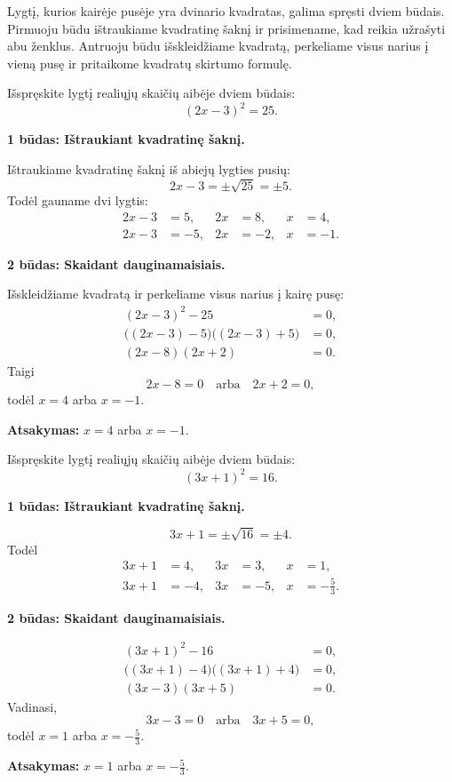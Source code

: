 \documentclass[11pt,a4paper]{scrartcl}
\begin{document}
Lygtį, kurios kairėje pusėje yra dvinario kvadratas, galima spręsti dviem būdais. Pirmuoju būdu ištraukiame kvadratinę šaknį ir prisimename, kad reikia užrašyti abu ženklus. Antruoju būdu išskleidžiame kvadratą, perkeliame visus narius į vieną pusę ir pritaikome kvadratų skirtumo formulę.

\begin{example}
Išspręskite lygtį realiųjų skaičių aibėje dviem būdais:
\[ (2x-3)^2=25. \]
\end{example}
\begin{solution}
\textbf{1 būdas: Ištraukiant kvadratinę šaknį.}

Ištraukiame kvadratinę šaknį iš abiejų lygties pusių:
\[
2x-3=\pm\sqrt{25}=\pm5.
\]
Todėl gauname dvi lygtis:
\[
\begin{aligned}
2x-3&=5, & 2x&=8, & x&=4,\\
2x-3&=-5, & 2x&=-2, & x&=-1.
\end{aligned}
\]

\textbf{2 būdas: Skaidant dauginamaisiais.}

Išskleidžiame kvadratą ir perkeliame visus narius į kairę pusę:
\[
\begin{aligned}
(2x-3)^2-25&=0,\\
\bigl((2x-3)-5\bigr)\bigl((2x-3)+5\bigr)&=0,\\
(2x-8)(2x+2)&=0.
\end{aligned}
\]
Taigi
\[
2x-8=0 \quad \text{arba} \quad 2x+2=0,
\]
todėl $x=4$ arba $x=-1$.

\textbf{Atsakymas:} $x=4$ arba $x=-1$.
\end{solution}

\begin{example}
Išspręskite lygtį realiųjų skaičių aibėje dviem būdais:
\[ (3x+1)^2=16. \]
\end{example}
\begin{solution}
\textbf{1 būdas: Ištraukiant kvadratinę šaknį.}

\[
3x+1=\pm\sqrt{16}=\pm4.
\]
Todėl
\[
\begin{aligned}
3x+1&=4, & 3x&=3, & x&=1,\\
3x+1&=-4, & 3x&=-5, & x&=-\frac{5}{3}.
\end{aligned}
\]

\textbf{2 būdas: Skaidant dauginamaisiais.}

\[
\begin{aligned}
(3x+1)^2-16&=0,\\
\bigl((3x+1)-4\bigr)\bigl((3x+1)+4\bigr)&=0,\\
(3x-3)(3x+5)&=0.
\end{aligned}
\]
Vadinasi,
\[
3x-3=0 \quad \text{arba} \quad 3x+5=0,
\]
todėl $x=1$ arba $x=-\frac{5}{3}$.

\textbf{Atsakymas:} $x=1$ arba $x=-\frac{5}{3}$.
\end{solution}
\end{document}
